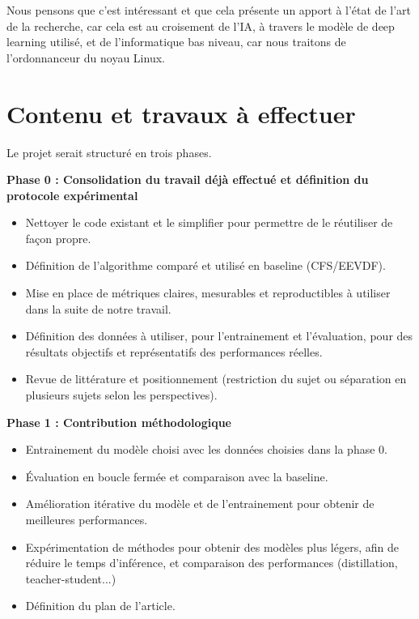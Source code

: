 \documentclass[11pt,a4paper]{article}
\begin{document}
Nous pensons que c'est intéressant et que cela présente un apport à l'état de l'art de la recherche, car cela est au croisement de l'IA, à travers le modèle de deep learning utilisé, et de l'informatique bas niveau, car nous traitons de l'ordonnanceur du noyau Linux.

\section{Contenu et travaux à effectuer}
Le projet serait structuré en trois phases.

\medskip
\noindent\textbf{Phase 0 : Consolidation du travail déjà effectué et définition du protocole expérimental}
\begin{itemize}[leftmargin=1.5em,itemsep=2pt]
    \item Nettoyer le code existant et le simplifier pour permettre de le réutiliser de façon propre.
    \item Définition de l'algorithme comparé et utilisé en baseline (CFS/EEVDF).
    \item Mise en place de métriques claires, mesurables et reproductibles à utiliser dans la suite de notre travail.
    \item Définition des données à utiliser, pour l'entrainement et l'évaluation, pour des résultats objectifs et représentatifs des performances réelles.
    \item Revue de littérature et positionnement (restriction du sujet ou séparation en plusieurs sujets selon les perspectives).
\end{itemize}

\noindent\textbf{Phase 1 : Contribution méthodologique}
\begin{itemize}[leftmargin=1.5em,itemsep=2pt]

    \item Entrainement du modèle choisi avec les données choisies dans la phase 0.
    \item Évaluation en boucle fermée et comparaison avec la baseline.
    \item Amélioration itérative du modèle et de l'entrainement pour obtenir de meilleures performances.
    \item Expérimentation de méthodes pour obtenir des modèles plus légers, afin de réduire le temps d'inférence, et comparaison des performances (distillation, teacher-student...)
    \item Définition du plan de l'article.
\end{itemize}
\end{document}
